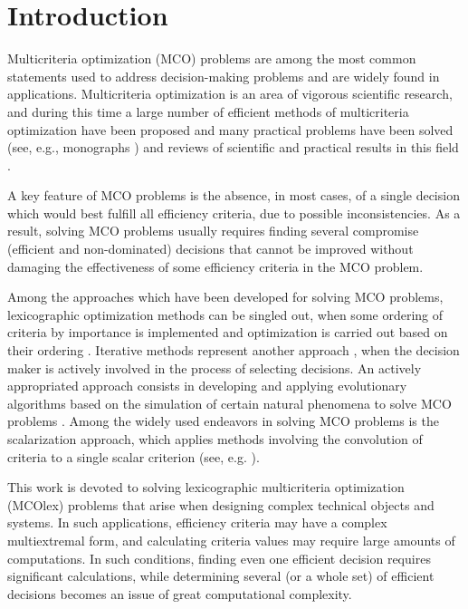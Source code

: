 \documentclass[smallextended]{svjour3}       %
\begin{document}
\section{Introduction}
\label{sec:1}

Multicriteria optimization (MCO) problems are among the most common statements used to address decision-making problems and are widely found in applications. Multicriteria optimization is an area of vigorous scientific research, and during this time a large number of efficient methods of multicriteria optimization have been proposed and many practical problems have been solved (see, e.g., monographs \cite{c1,c2,c3,c4}) and reviews of scientific and practical results in this field \cite{c6,c7,c8,c9}.

A key feature of MCO problems is the absence, in most cases, of a single decision which would best fulfill all efficiency criteria, due to possible inconsistencies. As a result, solving MCO problems usually requires finding several compromise (efficient and non-dominated) decisions that cannot be improved without damaging the effectiveness of some efficiency criteria in the MCO problem.

Among the approaches which have been developed for solving MCO problems, lexicographic optimization methods can be singled out, when some ordering of criteria by importance is implemented and optimization is carried out based on their ordering \cite{c3}. Iterative methods represent another approach \cite{c6,c10}, when the decision maker is actively involved in the process of selecting decisions. An actively appropriated approach consists in developing and applying evolutionary algorithms based on the simulation of certain natural phenomena to solve MCO problems \cite{c10,c11,c12,c13}. Among the widely used endeavors in solving MCO problems is the scalarization approach, which applies methods involving the convolution of criteria to a single scalar criterion (see, e.g. \cite{c2,c14}).

This work is devoted to solving lexicographic multicriteria optimization (MCOlex) problems that arise when designing complex technical objects and systems. In such applications, efficiency criteria may have a complex multiextremal form, and calculating criteria values may require large amounts of computations. In such conditions, finding even one efficient decision requires significant calculations, while determining several (or a whole set) of efficient decisions becomes an issue of great computational complexity.
\end{document}
